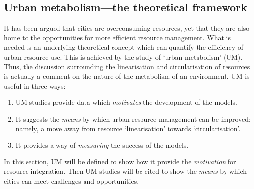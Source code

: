 \subsection{Urban metabolism---the theoretical framework}
It has been argued that cities are overconsuming resources, yet that they are also home to the opportunities for more efficient resource management. What is needed is an underlying theoretical concept which can quantify the efficiency of urban resource use. This is achieved by the study of `urban metabolism' (UM). Thus, the discussion surrounding the linearisation and circularisation of resources is actually a comment on the nature of the metabolism of an environment. UM is useful in three ways:
\begin{enumerate}
	\item UM studies provide data which \emph{motivates} the development of the models. 
	\item It suggests the \emph{means} by which urban resource management can be improved: namely, a move away from resource `linearisation' towards `circularisation'. 
	\item It provides a way of \emph{measuring} the success of the models. 
\end{enumerate}
In this section, UM will be defined to show how it provide the \emph{motivation} for resource integration. Then UM studies will be cited to show the \emph{means} by which cities can meet challenges and opportunities.


